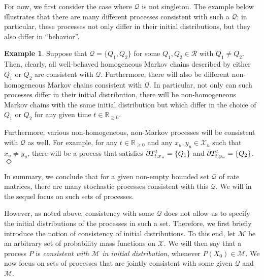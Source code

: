 \documentclass[10pt,a4paper]{paper}
\theoremstyle{definition}
\newtheorem{exmp}{Example}%
\newcommand{\reals}{\mathbb{R}}
\newcommand{\realsnonneg}{\reals_{\geq 0}}
\newcommand{\states}{\mathcal{X}}
\newcommand{\rateset}{\mathcal{Q}}
\newcommand{\exampleend}{\hfill$\Diamond$}
\begin{document}
For now, we first consider the case where $\rateset$ is not singleton. The example below illustrates that there are many different processes consistent with such a $\rateset$; in particular, these processes not only differ in their initial distributions, but they also differ in ``behavior''.


\begin{exmp}\label{example:rateset_not_singleton}
Suppose that $\rateset=\{Q_1,Q_2\}$ for some $Q_1,Q_2\in\mathcal{R}$ with $Q_1\neq Q_2$. Then, clearly, all well-behaved homogeneous Markov chains described by either $Q_1$ or $Q_2$ are consistent with $\rateset$. Furthermore, there will also be different non-homogeneous Markov chains consistent with $\rateset$. In particular, not only can such processes differ in their initial distribution, there will be non-homogeneous Markov chains with the same initial distribution but which differ in the choice of $Q_1$ or $Q_2$ for any given time $t\in\realsnonneg$. 

Furthermore, various non-homogeneous, non-Markov processes will be consistent with $\rateset$ as well. For example, for any $t\in\realsnonneg$ and any $x_u,y_u\in\states_u$ such that $x_u\neq y_u$, there will be a process that satisfies $\smash{\overline{\partial}}T_{t,x_u}^t=\{Q_1\}$ and $\smash{\overline{\partial}}T_{t,y_u}^t=\{Q_2\}$.
\exampleend
\end{exmp}

In summary, we conclude that for a given non-empty bounded set $\rateset$ of rate matrices, there are many stochastic processes consistent with this $\rateset$. We will in the sequel focus on such sets of processes. 

However, as noted above, consistency with some $\rateset$ does not allow us to specify the initial distributions of the processes in such a set. Therefore, we first briefly introduce the notion of consistency of initial distributions. To this end, let $\mathcal{M}$ be an arbitrary set of probability mass functions on $\states$. We will then say that a process $P$ is \emph{consistent with $\mathcal{M}$ in initial distribution}, whenever $P(X_0)\in\mathcal{M}$. We now focus on sets of processes that are jointly consistent with some given $\rateset$ and $\mathcal{M}$.
\end{document}
